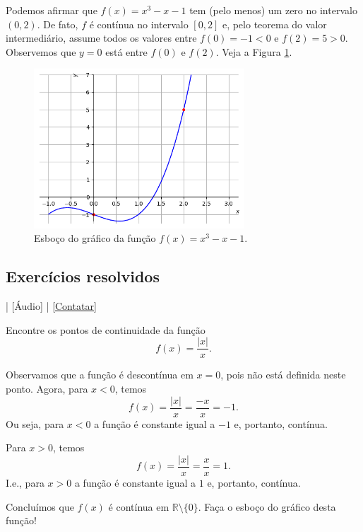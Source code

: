 \begin{ex}
  Podemos afirmar que $f(x)=x^3-x-1$ tem (pelo menos) um zero no intervalo $(0, 2)$. De fato, $f$ é contínua no intervalo $[0,2]$ e, pelo teorema do valor intermediário, assume todos os valores entre $f(0)=-1<0$ e $f(2)=5>0$. Observemos que $y = 0$ está entre $f(0)$ e $f(2)$. Veja a Figura \ref{fig:cap_lim_ex_teoint}.

  \begin{figure}[H]
    \centering
    \includegraphics[width=0.7\textwidth]{./cap_lim/dados/fig_cap_lim_ex_teoint/fig_cap_lim_ex_teoint}
    \caption{Esboço do gráfico da função $f(x) = x^3-x-1$.}
    \label{fig:cap_lim_ex_teoint}
  \end{figure}
\end{ex}

\subsection*{Exercícios resolvidos}

\begin{flushright}
  [Vídeo] | [Áudio] | \href{https://phkonzen.github.io/notas/contato.html}{[Contatar]}
\end{flushright}

\begin{exeresol}
  Encontre os pontos de continuidade da função
  \begin{equation}
    f(x) = \frac{|x|}{x}.
  \end{equation}
\end{exeresol}
\begin{resol}
  Observamos que a função é descontínua em $x=0$, pois não está definida neste ponto. Agora, para $x < 0$, temos
  \begin{equation}
    f(x) = \frac{|x|}{x} = \frac{-x}{x} = -1.
  \end{equation}
  Ou seja, para $x<0$ a função é constante igual a $-1$ e, portanto, contínua.

  Para $x > 0$, temos
  \begin{equation}
    f(x) = \frac{|x|}{x} = \frac{x}{x} = 1.
  \end{equation}
  I.e., para $x > 0$ a função é constante igual a $1$ e, portanto, contínua.

  Concluímos que $f(x)$ é contínua em $\mathbb{R}\setminus\{0\}$. Faça o esboço do gráfico desta função!
\end{resol}


